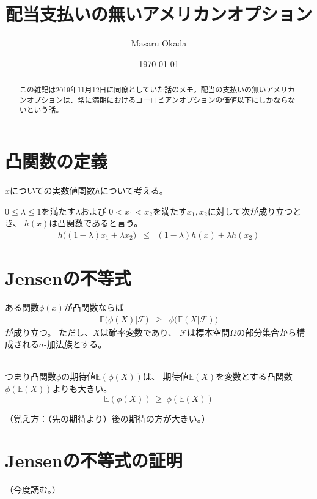 \documentclass[uplatex,a4j,12pt,dvipdfmx]{jsarticle}
\title{
配当支払いの無いアメリカンオプション
}
\author{Masaru Okada}
\date{\today}
\begin{document}
\maketitle

\begin{abstract}
	この雑記は2019年11月12日に同僚としていた話のメモ。配当の支払いの無いアメリカンオプションは、常に満期におけるヨーロピアンオプションの価値以下にしかならないという話。
\end{abstract}

\section{凸関数の定義}

$x$についての実数値関数$h$について考える。

$0 \leq \lambda \leq 1$を満たす$\lambda$および
$0<x_{1}<x_{2}$を満たす$x_{1},x_{2}$に対して次が成り立つとき、
$h(x)$は凸関数であると言う。
%
%
\begin{eqnarray*}
	h \Big( (1- \lambda) x_{1} + \lambda x_{2} \Big)
	&\leq&
	(1- \lambda) h(x) + \lambda h(x_{2})
\end{eqnarray*}
%
%

\section{Jensenの不等式}

ある関数$\phi(x)$が凸関数ならば
%
%
\begin{eqnarray*}
	\mathbb{E} \Big( \phi(X) \Big| \mathcal{F} \Big)
	&\geq&
	\phi \Big( \mathbb{E}(X|\mathcal{F}) \Big)
\end{eqnarray*}
%
%
が成り立つ。
ただし、$X$は確率変数であり、
$\mathcal{F}$は標本空間$\Omega$の部分集合から構成される$\sigma$-加法族とする。

\ \\

つまり凸関数$\phi$の期待値$\mathbb{E}(\phi(X))$は、
期待値$\mathbb{E}(X)$を変数とする凸関数$\phi(\mathbb{E}(X))$よりも大きい。
$$
	\mathbb{E}(\phi(X))
	\ \geq \
	\phi(\mathbb{E}(X))
$$

（覚え方：（先の期待より）後の期待の方が大きい。）


\section{Jensenの不等式の証明}

（今度読む。）

\ \\
\end{document}
